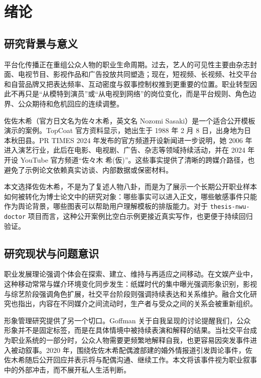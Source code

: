 \chapter{绪\quad 论}

\section{研究背景与意义}

平台化传播正在重组公众人物的职业生命周期。过去，艺人的可见性主要由杂志封面、电视节目、影视作品和广告投放共同塑造；现在，短视频、长视频、社交平台和自营品牌又把表达频率、互动密度与叙事控制权推到更重要的位置。职业转型因此不再只是“从模特到演员”或“从电视到网络”的岗位变化，而是平台规则、角色边界、公众期待和危机回应的连续调整。

佐佐木希（官方日文名为佐々木希，英文名 Nozomi Sasaki）是一个适合公开模板演示的案例。TopCoat 官方资料显示，她出生于 1988 年 2 月 8 日，出身地为日本秋田县\cite{topcoat-profile}。PR TIMES 2024 年发布的官方频道开设新闻进一步说明，她 2006 年进入演艺行业，此后在电影、电视剧、广告、杂志等领域持续活动，并在 2024 年开设 YouTube 官方频道“佐々木 希(仮)”\cite{youtube-prtimes}。这些事实提供了清晰的跨媒介路径，也避免了示例论文依赖真实访谈、内部数据或保密材料。

本文选择佐佐木希，不是为了复述人物八卦，而是为了展示一个长期公开职业样本如何被转化为博士论文中的研究对象：哪些事实可以进入正文，哪些敏感事件只能作为舆论背景，哪些图表可以帮助用户理解模板的排版能力。对于 \texttt{thesis-nwu-doctor} 项目而言，这种公开案例比空白示例更接近真实写作，也更便于持续回归验证。

\section{研究现状与问题意识}

职业发展理论强调个体会在探索、建立、维持与再适应之间移动\cite{super-career}。在文娱产业中，这种移动常常与媒介环境变化同步发生：纸媒时代的集中曝光强调形象识别，影视与综艺阶段强调角色扩展，社交平台阶段则强调持续表达和关系维护。融合文化研究也指出，内容在不同媒介之间流动时，生产者与受众之间的关系会被重新组织\cite{jenkins-convergence}。

形象管理研究提供了另一个切口。Goffman 关于自我呈现的讨论提醒我们，公众形象并不是固定标签，而是在具体情境中被持续表演和解释的结果\cite{goffman-presentation}。当社交平台成为职业系统的一部分时，公众人物需要更频繁地解释自我，也更容易因突发事件进入被动叙事。2020 年，围绕佐佐木希配偶渡部建的婚外情报道引发舆论事件，佐佐木希随后公开回应并表示将与配偶沟通、继续工作\cite{nikkan-2020}。本文将该事件视为职业叙事中的外部冲击，而不展开私人生活判断。

